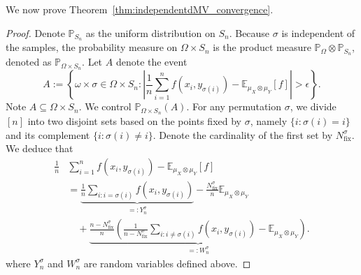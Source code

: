 \documentclass[12pt]{article}
\newcommand{\EE}{\mathbb{E}}
\newcommand{\PP}{\mathbb{P}}
\theoremstyle{definition}
\begin{document}
We now prove Theorem~\ref{thm:independentdMV_convergence}. 
\begin{proof}


Denote $\PP_{S_n}$ as the uniform distribution on $S_n$.
Because $\sigma$ is independent of the samples, the probability measure on $\Omega \times S_n$ is the product measure $\PP_{\Omega} \otimes \PP_{S_n}$, denoted as $\PP_{\Omega\times S_n}$.
Let $A$ denote the event
$$
A  :=\left\{\omega \times \sigma \in \Omega \times S_n: \left| \frac{1}{n} \sum^n_{i=1} f\left(x_i, y_{\sigma(i)}\right)  -  \EE_{ \mu_X \otimes \mu_Y}[f]   \right|> \epsilon\right\}. 
$$ Note $A\subseteq \Omega \times S_n $. We control $\PP_{\Omega\times S_n}(A)$. 
For any permutation $\sigma$, we divide $[n]$ into two disjoint sets based on the points fixed by $\sigma$, namely $\{i : \sigma(i) = i\}$ and its complement $\{i : \sigma(i) \neq i\}$. Denote the cardinality of the first set by $N^{\sigma}_{\text{fix}}$. We deduce that 
\begin{align*}
\frac{1}{n} &\sum^n_{i=1} f\left(x_i, y_{\sigma(i)}\right)  -  \EE_{ \mu_X \otimes \mu_Y}[f]\\
&= 
\underbrace{\frac{1}{n} \sum_{i:i=\sigma(i)}  f\left(x_i, y_{\sigma(i)}\right)}_{=:Y_n^{\sigma}} - \frac{N^{\sigma}_{\text{fix}}}{n}\EE_{ \mu_X \otimes \mu_Y}\\
&\quad +  \underbrace{\frac{n-N^{\sigma}_{\text{fix}}}{n} \left(\frac{1}{n-N^{\sigma}_{\text{fix}}} \sum_{i:i \neq \sigma(i)}  f\left(x_i, y_{\sigma(i)}\right) - \EE_{ \mu_X \otimes \mu_Y}  \right) }_{=:W_n^{\sigma}}.
\end{align*}
where $Y_n^{\sigma}$ and $W_n^{\sigma}$ are random variables defined above. 


\end{proof}
\end{document}
